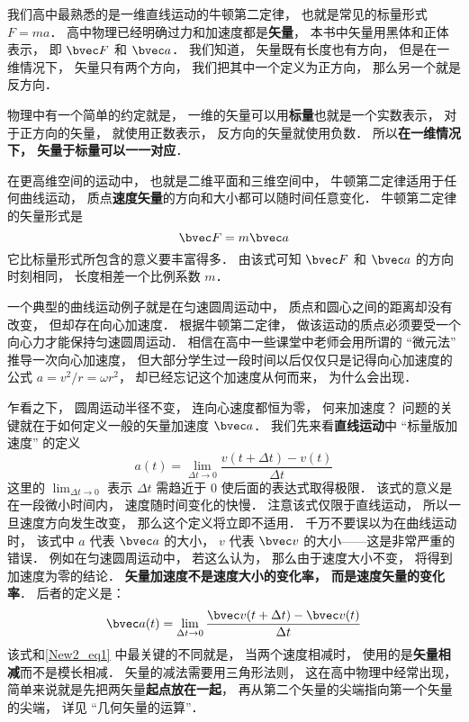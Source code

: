 
\begin{issues}
\issueTODO
\end{issues}


我们高中最熟悉的是一维直线运动的牛顿第二定律， 也就是常见的标量形式 $F = ma$． 高中物理已经明确过力和加速度都是\textbf{矢量}， 本书中矢量用黑体和正体表示， 即 $\bvec F$ 和 $\bvec a$． 我们知道， 矢量既有长度也有方向， 但是在一维情况下， 矢量只有两个方向， 我们把其中一个定义为正方向， 那么另一个就是反方向． 

物理中有一个简单的约定就是， 一维的矢量可以用\textbf{标量}也就是一个实数表示， 对于正方向的矢量， 就使用正数表示， 反方向的矢量就使用负数． 所以\textbf{在一维情况下， 矢量于标量可以一一对应}．

在更高维空间的运动中， 也就是二维平面和三维空间中， 牛顿第二定律适用于任何曲线运动， 质点\textbf{速度矢量}的方向和大小都可以随时间任意变化． 牛顿第二定律的矢量形式是
\begin{equation}
\bvec F = m\bvec a
\end{equation}
它比标量形式所包含的意义要丰富得多． 由该式可知 $\bvec F$ 和 $\bvec a$ 的方向时刻相同， 长度相差一个比例系数 $m$．

一个典型的曲线运动例子就是在匀速圆周运动中， 质点和圆心之间的距离却没有改变， 但却存在向心加速度． 根据牛顿第二定律， 做该运动的质点必须要受一个向心力才能保持匀速圆周运动． 相信在高中一些课堂中老师会用所谓的 “微元法” 推导一次向心加速度， 但大部分学生过一段时间以后仅仅只是记得向心加速度的公式 $a = v^2/r = \omega r^2$， 却已经忘记这个加速度从何而来， 为什么会出现．

乍看之下， 圆周运动半径不变， 连向心速度都恒为零， 何来加速度？ 问题的关键就在于如何定义一般的矢量加速度 $\bvec a$． 我们先来看\textbf{直线运动}中 “标量版加速度” 的定义
\begin{equation}\label{New2_eq1}
a(t) = \lim_{\Delta t\to 0}\frac{v(t+\Delta t) - v(t)}{\Delta t}
\end{equation}
这里的 $\lim_{\Delta t\to 0}$ 表示 $\Delta t$ 需趋近于 0 使后面的表达式取得极限． 该式的意义是在一段微小时间内， 速度随时间变化的快慢． 注意该式仅限于直线运动， 所以一旦速度方向发生改变， 那么这个定义将立即不适用． 千万不要误以为在曲线运动时， 该式中 $a$ 代表 $\bvec a$ 的大小， $v$ 代表 $\bvec v$ 的大小——这是非常严重的错误． 例如在匀速圆周运动中， 若这么认为， 那么由于速度大小不变， 将得到加速度为零的结论． \textbf{矢量加速度不是速度大小的变化率， 而是速度矢量的变化率}． 后者的定义是：
\begin{equation}\label{New2_eq2}
\bvec a(t) = \lim_{\Delta t\to 0}\frac{\bvec v(t+\Delta t) - \bvec v(t)}{\Delta t}
\end{equation}
该式和\autoref{New2_eq1} 中最关键的不同就是， 当两个速度相减时， 使用的是\textbf{矢量相减}而不是模长相减． 矢量的减法需要用三角形法则， 这在高中物理中经常出现， 简单来说就是先把两矢量\textbf{起点放在一起}， 再从第二个矢量的尖端指向第一个矢量的尖端， 详见 “几何矢量的运算”．

